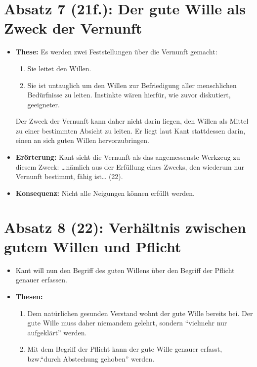 \documentclass{llncs}
\begin{document}
\section*{Absatz 7 (21f.): Der gute Wille als Zweck der Vernunft}

\begin{itemize}
	\item \textbf{These:} Es werden zwei Feststellungen über die Vernunft gemacht:
		\begin{enumerate}
			\item Sie leitet den Willen.
			\item Sie ist untauglich um den Willen zur Befriedigung aller menschlichen Bedürfnisse zu leiten.
			 	Instinkte wären hierfür, wie zuvor diskutiert, geeigneter.
		\end{enumerate}
		Der Zweck der Vernunft kann daher nicht darin liegen, den Willen als Mittel zu einer bestimmten Absicht zu leiten.
		Er liegt laut Kant stattdessen darin, einen an sich guten Willen hervorzubringen.
	\item \textbf{Erörterung:} Kant sieht die Vernunft als das angemessenste Werkzeug zu diesem Zweck:
		\glqq{}\ldots  nämlich aus der Erfüllung eines Zwecks, den wiederum nur Vernunft bestimmt, fähig ist\ldots\grqq{} (22).
	\item \textbf{Konsequenz:} Nicht alle Neigungen können erfüllt werden.
\end{itemize}

\section*{Absatz 8 (22): Verhältnis zwischen gutem Willen und Pflicht}

\begin{itemize}
	\item Kant will nun den Begriff des guten Willens über den Begriff der Pflicht genauer erfassen.
	\item \textbf{Thesen:}
	 	\begin{enumerate}
	 		\item Dem natürlichen gesunden Verstand wohnt der gute Wille bereits bei.
				Der gute Wille muss daher niemandem gelehrt, sondern ``vielmehr nur aufgeklärt'' werden.
			\item Mit dem Begriff der Pflicht kann der gute Wille genauer erfasst, bzw.\@ ``durch Abstechung gehoben'' werden.
	 	\end{enumerate}
\end{itemize}
\end{document}
